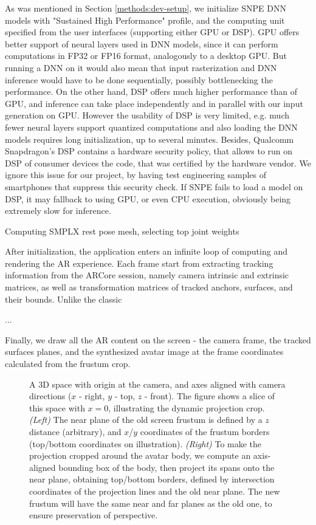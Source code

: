 As was mentioned in Section \ref{methods:dev-setup}, we initialize SNPE DNN models with "Sustained High Performance" profile, and the computing unit specified from the user interfaces (supporting either GPU or DSP). GPU offers better support of neural layers used in DNN models, since it can perform computations in FP32 or FP16 format, analogously to a desktop GPU. But running a DNN on it would also mean that input rasterization and DNN inference would have to be done sequentially, possibly bottlenecking the performance. On the other hand, DSP offers much higher performance than of GPU, and inference can take place independently and in parallel with our input generation on GPU. However the usability of DSP is very limited, e.g. much fewer neural layers support quantized computations and also loading the DNN models requires long initialization, up to several minutes. Besides, Qualcomm Snapdragon's DSP contains a hardware security policy, that allows to run on DSP of consumer devices the code, that was certified by the hardware vendor. We ignore this issue for our project, by having test engineering samples of smartphones that suppress this security check. If SNPE fails to load a model on DSP, it may fallback to using GPU, or even CPU execution, obviously being extremely slow for inference.

Computing SMPLX rest pose mesh, selecting top joint weights

After initialization, the application enters an infinite loop of computing and rendering the AR experience. Each frame start from extracting tracking information from the ARCore session, namely camera intrinsic and extrinsic matrices, as well as transformation matrices of tracked anchors, surfaces, and their bounds. Unlike the classic 

...

Finally, we draw all the AR content on the screen - the camera frame, the tracked surfaces planes, and the synthesized avatar image at the frame coordinates calculated from the frustum crop.


\begin{figure}[ht]
	\centering
	\caption{A 3D space with origin at the camera, and axes aligned with camera directions ($x$ - right, $y$ - top, $z$ - front). The figure shows a slice of this space with $x=0$, illustrating the dynamic projection crop. \textit{(Left)} The near plane of the old screen frustum is defined by a $z$ distance (arbitrary), and $x$/$y$ coordinates of the frustum borders (top/bottom coordinates on illustration). \textit{(Right)} To make the projection cropped around the avatar body, we compute an axis-aligned bounding box of the body, then project its spans onto the near plane, obtaining top/bottom borders, defined by intersection coordinates of the projection lines and the old near plane. The new frustum will have the same near and far planes as the old one, to ensure preservation of perspective.}
	\label{fig:dynamic_crop_math}
\end{figure}

